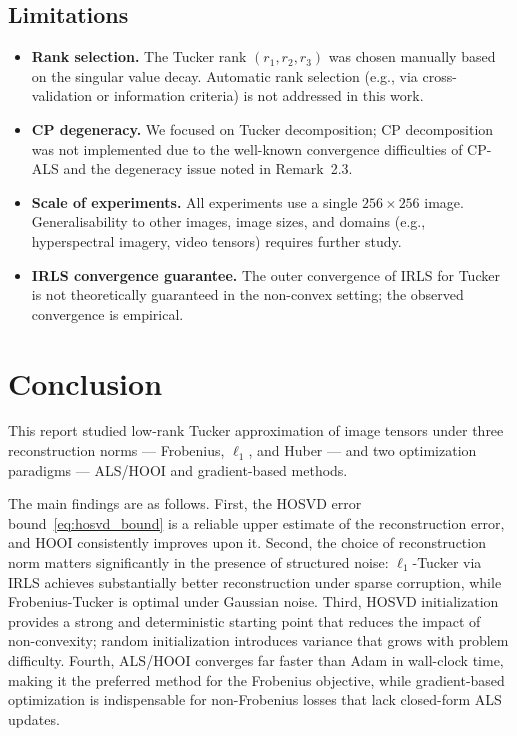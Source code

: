 \subsection{Limitations}
\label{subsec:limitations}

\begin{itemize}
  \item \textbf{Rank selection.}
        The Tucker rank $(r_1, r_2, r_3)$ was chosen manually based on the
        singular value decay.
        Automatic rank selection (e.g., via cross-validation or information
        criteria) is not addressed in this work.

  \item \textbf{CP degeneracy.}
        We focused on Tucker decomposition; CP decomposition was not
        implemented due to the well-known convergence difficulties of
        CP-ALS and the degeneracy issue noted in Remark~2.3.

  \item \textbf{Scale of experiments.}
        All experiments use a single $256 \times 256$ image.
        Generalisability to other images, image sizes, and domains
        (e.g., hyperspectral imagery, video tensors) requires further study.

  \item \textbf{IRLS convergence guarantee.}
        The outer convergence of IRLS for Tucker is not theoretically
        guaranteed in the non-convex setting; the observed convergence is
        empirical.
\end{itemize}

\section{Conclusion}
\label{sec:conclusion}

This report studied low-rank Tucker approximation of image tensors under
three reconstruction norms --- Frobenius, $\ell_1$, and Huber --- and
two optimization paradigms --- ALS/HOOI and gradient-based methods.

The main findings are as follows.
First, the HOSVD error bound~\eqref{eq:hosvd_bound} is a reliable
upper estimate of the reconstruction error, and HOOI consistently
improves upon it.
Second, the choice of reconstruction norm matters significantly in the
presence of structured noise: $\ell_1$-Tucker via IRLS achieves
substantially better reconstruction under sparse corruption, while
Frobenius-Tucker is optimal under Gaussian noise.
Third, HOSVD initialization provides a strong and deterministic starting
point that reduces the impact of non-convexity; random initialization
introduces variance that grows with problem difficulty.
Fourth, ALS/HOOI converges far faster than Adam in wall-clock time,
making it the preferred method for the Frobenius objective, while
gradient-based optimization is indispensable for non-Frobenius losses
that lack closed-form ALS updates.

